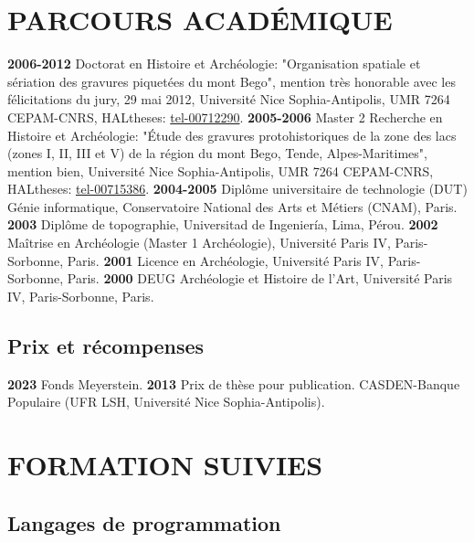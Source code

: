 \documentclass{article}
\begin{document}
\section{PARCOURS ACADÉMIQUE}

\textbf{2006-2012} Doctorat en Histoire et Archéologie: "Organisation spatiale et sériation des gravures piquetées du mont Bego", mention très honorable avec les félicitations du jury, 29 mai 2012, Université Nice Sophia-Antipolis, UMR 7264 CEPAM-CNRS, HALtheses: \href{https://tel.archives-ouvertes.fr/tel-00712290}{tel-00712290}.
\smallbreak
\textbf{2005-2006} Master 2 Recherche en Histoire et Archéologie: "Étude des gravures protohistoriques de la zone des lacs (zones I, II, III et V) de la région du mont Bego, Tende, Alpes-Maritimes", mention bien, Université Nice Sophia-Antipolis, UMR 7264 CEPAM-CNRS, HALtheses: \href{https://tel.archives-ouvertes.fr/tel-00715386}{tel-00715386}.
\smallbreak
\textbf{2004-2005} Diplôme universitaire de technologie (DUT) Génie informatique, Conservatoire National des Arts et Métiers (CNAM), Paris.
\smallbreak
\textbf{2003} Diplôme de topographie, Universitad de Ingeniería, Lima, Pérou.
\smallbreak
\textbf{2002} Maîtrise en Archéologie (Master 1 Archéologie), Université Paris IV, Paris-Sorbonne, Paris.
\smallbreak
\textbf{2001} Licence en Archéologie, Université Paris IV, Paris-Sorbonne, Paris.
\smallbreak
\textbf{2000} DEUG Archéologie et Histoire de l'Art, Université Paris IV, Paris-Sorbonne, Paris.

\subsection*{Prix et récompenses}

\textbf{2023} Fonds Meyerstein.
\smallbreak
\textbf{2013} Prix de thèse pour publication. CASDEN-Banque Populaire (UFR LSH, Université Nice Sophia-Antipolis).

\section*{FORMATION SUIVIES}

\subsection*{Langages de programmation}
\end{document}
